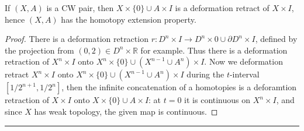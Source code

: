 \begin{prop} If $(X,A)$ is a CW pair, then $X\times \{0\}\cup A\times I$ is a deformation retract of $X\times I$, hence $(X,A)$ has the homotopy extension property.
\end{prop}
\begin{proof} There is a deformation retraction $r:D^n\times I \rightarrow D^n\times {0}\cup \partial D^n\times I$, defined by the projection from $(0,2)\in D^n\times \mathbb{R}$ for example. Thus there is a deformation retraction of $X^n\times I$ onto $X^n\times \{0\}\cup (X^{n-1}\cup A^n)\times I$. Now we deformation retract $X^n\times I$ onto $X^{n}\times \{0\}\cup (X^{n-1}\cup A^n)\times I$ during the $t$-interval $[1/2^{n+1},1/2^n]$, then the infinite concatenation of a homotopies is a deforamtion retraction of $X\times I$ onto $X\times\{0\}\cup A\times I$: at $t=0$ it is continuous on $X^n\times I$, and since $X$ has weak topology, the given map is continuous.
\end{proof}
\noindent\rule{\textwidth}{1pt}
\newline